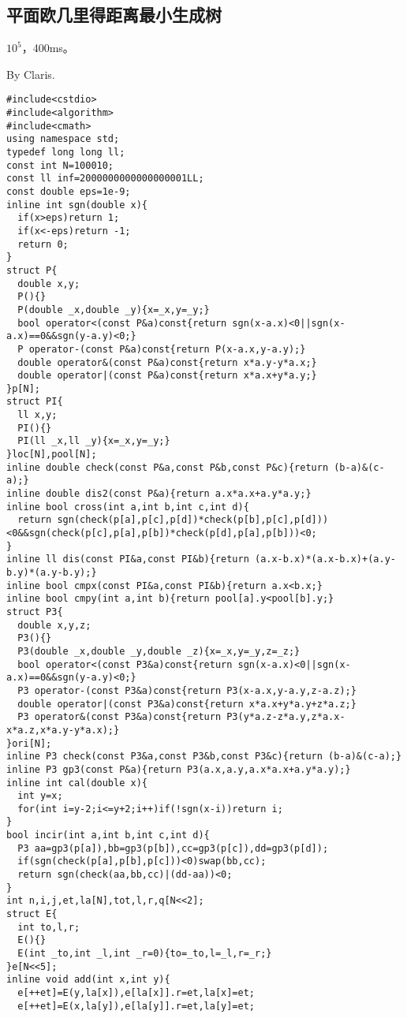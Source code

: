 \documentclass{ctexart}
\begin{document}
\subsection{平面欧几里得距离最小生成树}

$10^5$，400ms。

By Claris.

\begin{lstlisting}
#include<cstdio>
#include<algorithm>
#include<cmath>
using namespace std;
typedef long long ll;
const int N=100010;
const ll inf=2000000000000000001LL;
const double eps=1e-9;
inline int sgn(double x){
  if(x>eps)return 1;
  if(x<-eps)return -1;
  return 0;
}
struct P{
  double x,y;
  P(){}
  P(double _x,double _y){x=_x,y=_y;}
  bool operator<(const P&a)const{return sgn(x-a.x)<0||sgn(x-a.x)==0&&sgn(y-a.y)<0;}
  P operator-(const P&a)const{return P(x-a.x,y-a.y);}
  double operator&(const P&a)const{return x*a.y-y*a.x;}
  double operator|(const P&a)const{return x*a.x+y*a.y;}
}p[N];
struct PI{
  ll x,y;
  PI(){}
  PI(ll _x,ll _y){x=_x,y=_y;}
}loc[N],pool[N];
inline double check(const P&a,const P&b,const P&c){return (b-a)&(c-a);}
inline double dis2(const P&a){return a.x*a.x+a.y*a.y;}
inline bool cross(int a,int b,int c,int d){
  return sgn(check(p[a],p[c],p[d])*check(p[b],p[c],p[d]))<0&&sgn(check(p[c],p[a],p[b])*check(p[d],p[a],p[b]))<0;
}
inline ll dis(const PI&a,const PI&b){return (a.x-b.x)*(a.x-b.x)+(a.y-b.y)*(a.y-b.y);}
inline bool cmpx(const PI&a,const PI&b){return a.x<b.x;}
inline bool cmpy(int a,int b){return pool[a].y<pool[b].y;}
struct P3{
  double x,y,z;
  P3(){}
  P3(double _x,double _y,double _z){x=_x,y=_y,z=_z;}
  bool operator<(const P3&a)const{return sgn(x-a.x)<0||sgn(x-a.x)==0&&sgn(y-a.y)<0;}
  P3 operator-(const P3&a)const{return P3(x-a.x,y-a.y,z-a.z);}
  double operator|(const P3&a)const{return x*a.x+y*a.y+z*a.z;}
  P3 operator&(const P3&a)const{return P3(y*a.z-z*a.y,z*a.x-x*a.z,x*a.y-y*a.x);}
}ori[N];
inline P3 check(const P3&a,const P3&b,const P3&c){return (b-a)&(c-a);}
inline P3 gp3(const P&a){return P3(a.x,a.y,a.x*a.x+a.y*a.y);}
inline int cal(double x){
  int y=x;
  for(int i=y-2;i<=y+2;i++)if(!sgn(x-i))return i;
}
bool incir(int a,int b,int c,int d){
  P3 aa=gp3(p[a]),bb=gp3(p[b]),cc=gp3(p[c]),dd=gp3(p[d]);
  if(sgn(check(p[a],p[b],p[c]))<0)swap(bb,cc);
  return sgn(check(aa,bb,cc)|(dd-aa))<0;
}
int n,i,j,et,la[N],tot,l,r,q[N<<2];
struct E{
  int to,l,r;
  E(){}
  E(int _to,int _l,int _r=0){to=_to,l=_l,r=_r;}
}e[N<<5];
inline void add(int x,int y){
  e[++et]=E(y,la[x]),e[la[x]].r=et,la[x]=et;
  e[++et]=E(x,la[y]),e[la[y]].r=et,la[y]=et;

\end{lstlisting}
\end{document}
